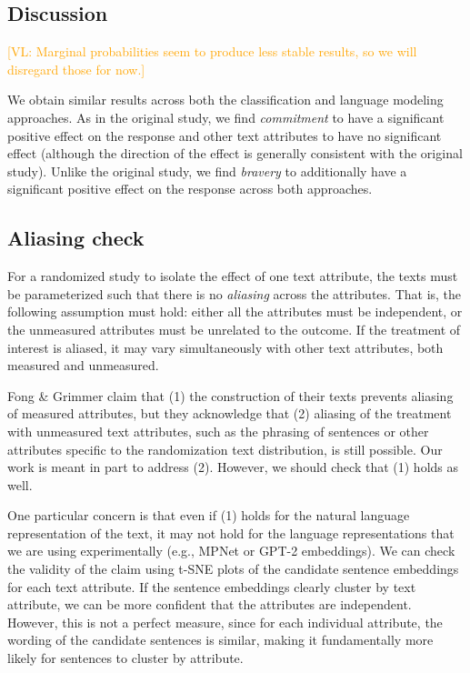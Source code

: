 \documentclass{article}
\newcommand{\vl}[1]{\textcolor{orange}{[VL: #1]}}
\begin{document}
\newpage
\subsection{Discussion}

\vl{Marginal probabilities seem to produce less stable results, so we will disregard those for now.}

We obtain similar results across both the classification and language modeling approaches.  As in the original study, we find \textit{commitment} to have a significant positive effect on the response and other text attributes to have no significant effect (although the direction of the effect is generally consistent with the original study). Unlike the original study, we find \textit{bravery} to additionally have a significant positive effect on the response across both approaches.

\subsection{Aliasing check}

For a randomized study to isolate the effect of one text attribute, the texts must be parameterized such that there is no \textit{aliasing} across the attributes. That is, the following assumption must hold: either all the attributes must be independent, or the unmeasured attributes must be unrelated to the outcome. If the treatment of interest is aliased, it may vary simultaneously with other text attributes, both measured and unmeasured.

Fong \& Grimmer claim that (1) the construction of their texts prevents aliasing of measured attributes, but they acknowledge that (2) aliasing of the treatment with unmeasured text attributes, such as the phrasing of sentences or other attributes specific to the randomization text distribution, is still possible. Our work is meant in part to address (2). However, we should check that (1) holds as well. 

One particular concern is that even if (1) holds for the natural language representation of the text, it may not hold for the language representations that we are using experimentally (e.g., MPNet or GPT-2 embeddings). We can check the validity of the claim using t-SNE plots of the candidate sentence embeddings for each text attribute. If the sentence embeddings clearly cluster by text attribute, we can be more confident that the attributes are independent. However, this is not a perfect measure, since for each individual attribute, the wording of the candidate sentences is similar, making it fundamentally more likely for sentences to cluster by attribute.
\end{document}
